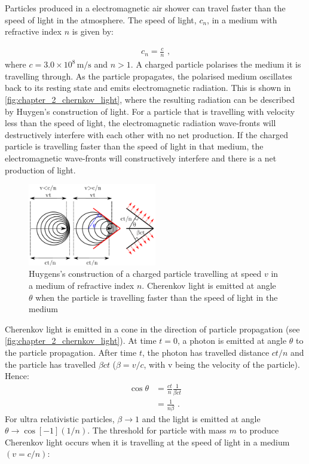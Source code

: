 Particles produced in a electromagnetic air shower can travel faster than the speed of light in the atmosphere. The speed of light, $c_n$, in a medium with refractive index $n$ is given by:

\begin{equation}
    \begin{aligned}
    c_n = \frac{c}{n}\text{ ,}
    \end{aligned}
\end{equation}
\noindent where $c=3.0\times 10^8\,\si{\meter\per\second}$ and $n>1$.
\newpar 
A charged particle polarises the medium it is travelling through. As the particle propagates, the polarised medium oscillates back to its resting state and emits electromagnetic radiation. This is shown in \autoref{fig:chapter_2_chernkov_light}, where the resulting radiation can be described by Huygen's construction of light. For a particle that is travelling with velocity less than the speed of light, the electromagnetic radiation wave-fronts will destructively interfere with each other with no net production. If the charged particle is travelling faster than the speed of light in that medium, the electromagnetic wave-fronts will constructively interfere and there is a net production of light.
\newpar
\begin{figure}
    \includegraphics[width=0.5\textwidth]{05_Astronomy/Images/air_shower/chernkov_light.pdf}
    \caption{Huygens's construction of a charged particle travelling at speed $v$ in a medium of refractive index $n$. Cherenkov light is emitted at angle $\theta$ when the particle is travelling faster than the speed of light in the medium}
    \label{fig:chapter_2_chernkov_light}
\end{figure}
Cherenkov light is emitted in a cone in the direction of particle propagation (see \autoref{fig:chapter_2_chernkov_light}). At time $t=0$, a photon is emitted at angle $\theta$ to the particle propagation. After time $t$, the photon has travelled distance $ct/n$ and the particle has travelled $\beta ct$ ($\beta=v/c$, with v being the velocity of the particle). Hence:
\begin{equation}
    \begin{aligned}
    \cos\theta &= \frac{ct}{n} \frac{1}{\beta ct} \\
    &=\frac{1}{n\beta}\text{ .}
    \end{aligned}
\end{equation}
\noindent For ultra relativistic particles, $\beta\rightarrow 1$ and the light is emitted at angle $\theta \rightarrow \cos[-1](1/n)$.
\newpar
The threshold for particle with mass $m$ to produce Cherenkov light occurs when it is travelling at the speed of light in a medium $(v=c/n)$:

